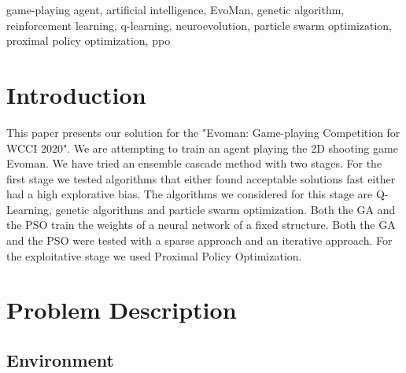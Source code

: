 \documentclass[conference]{IEEEtran}
\begin{document}
    \begin{IEEEkeywords}
        game-playing agent, artificial intelligence, EvoMan, genetic algorithm, reinforcement learning,
        q-learning, neuroevolution, particle swarm optimization, proximal policy optimization, ppo
    \end{IEEEkeywords}


    \section{Introduction}\label{sec:introduction}
    This paper presents our solution for the "Evoman: Game-playing Competition for WCCI 2020"\cite{evoman_competition}.
    We are attempting to train an agent playing the 2D shooting game Evoman\cite{evoman}.
    We have tried an ensemble cascade method with two stages.
    For the first stage we tested algorithms that either found acceptable solutions fast either had a high
    explorative bias.
    The algorithms we considered for this stage are Q-Learning\cite{q_learning}, genetic algorithms\cite{genetic_algorithm}
    and particle swarm optimization\cite{pso}.
    Both the GA and the PSO train the weights of a neural network of a fixed structure.
    Both the GA and the PSO were tested with a sparse approach and an iterative approach.
    For the exploitative stage we used Proximal Policy Optimization\cite{ppo}.


    \section{Problem Description}\label{sec:problem-description}

    \subsection{Environment}\label{subsec:environment}
\end{document}
